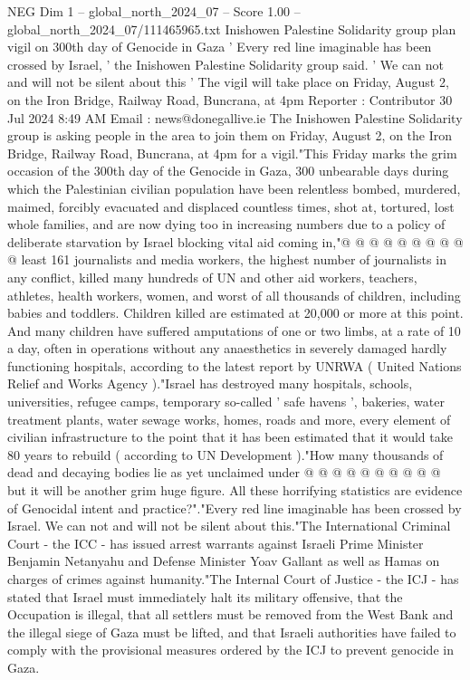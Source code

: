 \begin{textsample}{NEG Dim 1 – global\_north\_2024\_07 – Score 1.00 – global\_north\_2024\_07/111465965.txt}  \label{ex:f1_neg_275}
Inishowen Palestine Solidarity group plan vigil on 300th day of Genocide in Gaza ' Every red line imaginable has been crossed by Israel, ' the Inishowen Palestine Solidarity group said. ' We can not and will not be silent about this ' The vigil will take place on Friday, August 2, on the Iron Bridge, Railway Road, Buncrana, at 4pm Reporter : Contributor 30 Jul 2024 8:49 AM Email : news@donegallive.ie The Inishowen Palestine Solidarity group is asking people in the area to join them on Friday, August 2, on the Iron Bridge, Railway Road, Buncrana, at 4pm for a vigil."This Friday marks the grim occasion of the 300th day of the Genocide in Gaza, 300 unbearable days during which the Palestinian civilian population have been relentless bombed, murdered, maimed, forcibly evacuated and displaced countless times, shot at, tortured, lost whole families, and are now dying too in increasing numbers due to a policy of deliberate starvation by Israel blocking vital aid coming in,"@ @ @ @ @ @ @ @ @ @ least 161 journalists and media workers, the highest number of journalists in any conflict, killed many hundreds of UN and other aid workers, teachers, athletes, health workers, women, and worst of all thousands of children, including babies and toddlers.
Children killed are estimated at 20,000 or more at this point.
And many children have suffered amputations of one or two limbs, at a rate of 10 a day, often in operations without any anaesthetics in severely damaged hardly functioning hospitals, according to the latest report by UNRWA ( United Nations Relief and Works Agency )."Israel has destroyed many hospitals, schools, universities, refugee camps, temporary so-called ' safe havens ', bakeries, water treatment plants, water sewage works, homes, roads and more, every element of civilian infrastructure to the point that it has been estimated that it would take 80 years to rebuild ( according to UN Development )."How many thousands of dead and decaying bodies lie as yet unclaimed under @ @ @ @ @ @ @ @ @ @ but it will be another grim huge figure.
All these horrifying statistics are evidence of Genocidal intent and practice?"."Every red line imaginable has been crossed by Israel.
We can not and will not be silent about this."The International Criminal Court - the ICC - has issued arrest warrants against Israeli Prime Minister Benjamin Netanyahu and Defense Minister Yoav Gallant as well as Hamas on charges of crimes against humanity."The Internal Court of Justice - the ICJ - has stated that Israel must immediately halt its military offensive, that the Occupation is illegal, that all settlers must be removed from the West Bank and the illegal siege of Gaza must be lifted, and that Israeli authorities have failed to comply with the provisional measures ordered by the ICJ to prevent genocide in Gaza.

\end{textsample}
